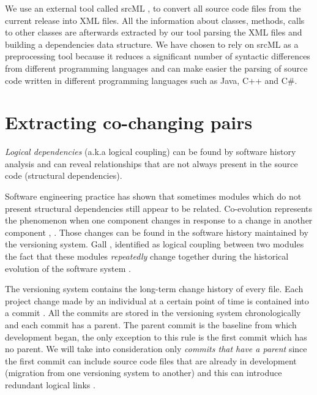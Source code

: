 \documentclass[12pt]{mitthesis}
\begin{document}
 We use an external tool called srcML \cite{2003:XLC:851042.857028},
\cite{Collard:2011:LTF:2067850.2068011} to convert all source code files from the current release into XML files. All the information about classes, methods, calls to other classes are afterwards extracted by our tool parsing the XML files and building a dependencies data structure. We have chosen to rely on srcML as a preprocessing tool because it reduces a significant number of syntactic differences from different programming languages and can make easier the parsing of source code written in different programming languages such as Java, C++ and C\#.    



\section{Extracting co-changing pairs}
\label{sec:copairs_extraction}
\textit{Logical dependencies} (a.k.a logical coupling) can be found by software history analysis and can reveal relationships that are not always present in the source code (structural dependencies).  

Software engineering practice has shown that sometimes modules which do not present structural dependencies still appear to be related. Co-evolution represents the phenomenon when one component changes in response to a change in another component \cite{Yu:2007:UCC:1231330.1231370}, \cite{5166450}. Those changes can be found in the software history maintained by the versioning system. Gall \cite{Gall:1998:DLC:850947.853338}, \cite{Gall:2003:CRH:942803.943741} identified as logical coupling between two modules the fact that these modules  \textit{repeatedly} change together during the historical evolution of the software system \cite{6606615}.

The versioning system contains the long-term change history of every file. Each project change made by an individual at a certain point of time is contained into a commit \cite{svn}. All the commits are stored in the versioning system chronologically and each commit has a parent. The parent commit is the baseline from which development began, the only exception to this rule is the first commit which has no parent. We will take into consideration only \textit{commits that have a parent} since the first commit can include source code files that are already in development (migration from one versioning system to another) and this can introduce redundant logical links \cite{DBLP:journals/jss/AjienkaC17}. 
\end{document}
